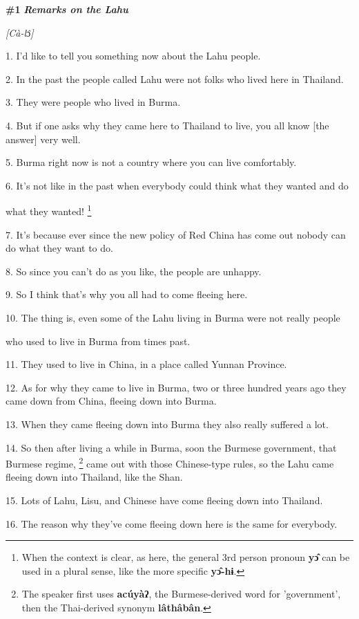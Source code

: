 
{\large{}\textbf{\#1 }}{\large{}\textit{\textbf{Remarks on the Lahu}}}

{\large{}\textit{[Cà-l}}{\large{}ɔ}{\large{}\textit{̂]}}

1. I'd like to tell you something now about the Lahu people.

2. In the past the people called Lahu were not folks who lived here in Thailand.

3. They were people who lived in Burma.

4. But if one asks why they came here to Thailand to live, you all know [the answer]
very well.

5. Burma right now is not a country where you can live comfortably.

6. It's not like in the past when everybody could think what they wanted and do

what they wanted! \footnote{When the context is clear, as here, the general 3rd person pronoun \textbf{yɔ̂} can be used in a plural sense, like the more specific \textbf{yɔ̂-hɨ}.}

7. It's because ever since the new policy of Red China has come out nobody can
do what they want to do.

8. So since you can't do as you like, the people are unhappy.

9. So I think that's why you all had to come fleeing here.

10. The thing is, even some of the Lahu living in Burma were not really people

who used to live in Burma from times past.

11. They used to live in China, in a place called Yunnan Province.

12. As for why they came to live in Burma, two or three hundred years ago they
came down from China, fleeing down into Burma.

13. When they came fleeing down into Burma they also really suffered a lot.

14. So then after living a while in Burma, soon the Burmese government, that Burmese
regime, \footnote{The speaker first uses \textbf{acúyàʔ}, the Burmese-derived word for 'government', then the Thai-derived synonym \textbf{lâthâbân}.} came out with those Chinese-type rules, so the Lahu came fleeing down
into Thailand, like the Shan.

15. Lots of Lahu, Lisu, and Chinese have come fleeing down into Thailand.

16. The reason why they've come fleeing down here is the same for everybody.

